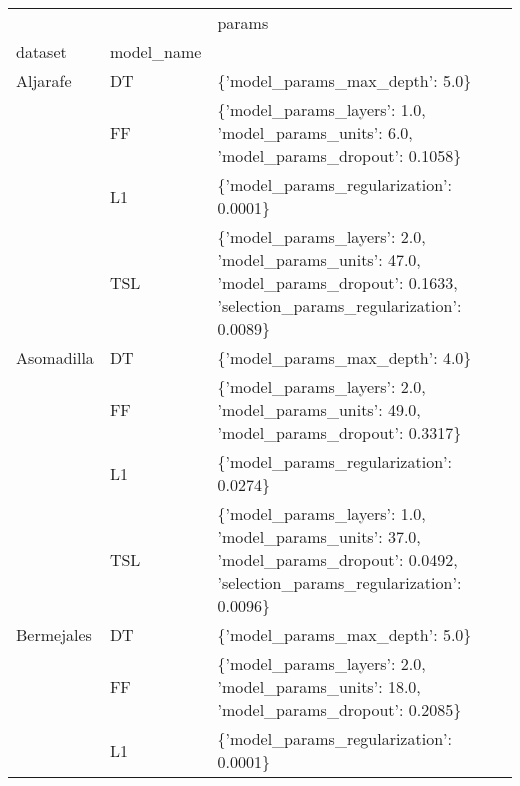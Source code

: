 \begin{tabular}{lll}
\toprule
       &     &                                                                                                                               params \\
dataset & model\_name &                                                                                                                                      \\
\midrule
Aljarafe & DT &                                                                                                      \{'model\_params\_max\_depth': 5.0\} \\
       & FF &                                              \{'model\_params\_layers': 1.0, 'model\_params\_units': 6.0, 'model\_params\_dropout': 0.1058\} \\
       & L1 &                                                                                              \{'model\_params\_regularization': 0.0001\} \\
       & TSL &  \{'model\_params\_layers': 2.0, 'model\_params\_units': 47.0, 'model\_params\_dropout': 0.1633, 'selection\_params\_regularization': 0.0089\} \\
Asomadilla & DT &                                                                                                      \{'model\_params\_max\_depth': 4.0\} \\
       & FF &                                             \{'model\_params\_layers': 2.0, 'model\_params\_units': 49.0, 'model\_params\_dropout': 0.3317\} \\
       & L1 &                                                                                              \{'model\_params\_regularization': 0.0274\} \\
       & TSL &  \{'model\_params\_layers': 1.0, 'model\_params\_units': 37.0, 'model\_params\_dropout': 0.0492, 'selection\_params\_regularization': 0.0096\} \\
Bermejales & DT &                                                                                                      \{'model\_params\_max\_depth': 5.0\} \\
       & FF &                                             \{'model\_params\_layers': 2.0, 'model\_params\_units': 18.0, 'model\_params\_dropout': 0.2085\} \\
       & L1 &                                                                                              \{'model\_params\_regularization': 0.0001\} \\

\end{tabular}

